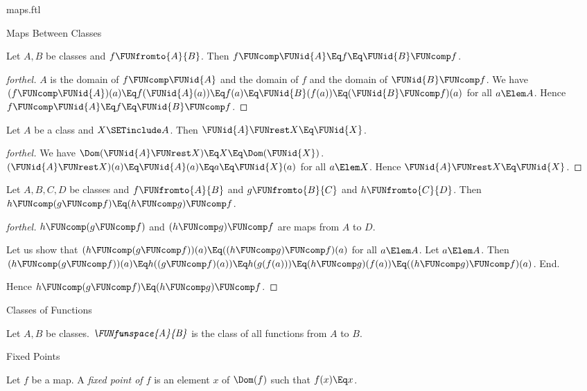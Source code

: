 \documentclass{stex}
\begin{document}
\begin{smodule}{maps.ftl}
\begin{sfragment}{Maps Between Classes}
  \begin{proposition}[forthel]
    Let $A, B$ be classes and $f \FUNfromto{A}{B}$.
    Then $f \FUNcomp \FUNid{A} \Eq f \Eq \FUNid{B} \FUNcomp f$.
  \end{proposition}
  \begin{proof}[forthel]
    $A$ is the domain of $f \FUNcomp \FUNid{A}$ and the domain of $f$ and the domain of $\FUNid{B} \FUNcomp f$.
    We have $(f \FUNcomp \FUNid{A})(a)
      \Eq f(\FUNid{A}(a))
      \Eq f(a)
      \Eq \FUNid{B}(f(a))
      \Eq (\FUNid{B} \FUNcomp f)(a)$
    for all $a \Elem A$.
    Hence $f \FUNcomp \FUNid{A}
      \Eq f
      \Eq \FUNid{B} \FUNcomp f$.
  \end{proof}

  \begin{proposition}[forthel]
    Let $A$ be a class and $X \SETinclude A$.
    Then $\FUNid{A} \FUNrest X \Eq \FUNid{X}$.
  \end{proposition}
  \begin{proof}[forthel]
    We have $\Dom(\FUNid{A} \FUNrest X)
      \Eq X
      \Eq \Dom(\FUNid{X})$.
    $(\FUNid{A} \FUNrest X)(a)
      \Eq \FUNid{A}(a)
      \Eq a
      \Eq \FUNid{X}(a)$
    for all $a \Elem X$.
    Hence $\FUNid{A} \FUNrest X \Eq \FUNid{X}$.
  \end{proof}

  \begin{proposition}[forthel]
    Let $A, B, C, D$ be classes and $f \FUNfromto{A}{B}$ and $g \FUNfromto{B}{C}$ and $h \FUNfromto{C}{D}$.
    Then $h \FUNcomp (g \FUNcomp f) \Eq (h \FUNcomp g) \FUNcomp f$.
  \end{proposition}
  \begin{proof}[forthel]
    $h \FUNcomp (g \FUNcomp f)$ and $(h \FUNcomp g) \FUNcomp f$ are maps from $A$ to $D$.

    Let us show that $(h \FUNcomp (g \FUNcomp f))(a) \Eq ((h \FUNcomp g) \FUNcomp f)(a)$ for all $a \Elem A$.
      Let $a \Elem A$.
      Then $(h \FUNcomp (g \FUNcomp f))(a)
        \Eq h((g \FUNcomp f)(a))
        \Eq h(g(f(a)))
        \Eq (h \FUNcomp g)(f(a))
        \Eq ((h \FUNcomp g) \FUNcomp f)(a)$.
    End.

    Hence $h \FUNcomp (g \FUNcomp f) \Eq (h \FUNcomp g) \FUNcomp f$.
  \end{proof}
\end{sfragment}

\begin{sfragment}{Classes of Functions}
  \begin{definition}[forthel]
    Let $A, B$ be classes.
    $\emph{\FUNfunspace{A}{B}}$ is the class of all functions from $A$ to $B$.
  \end{definition}
\end{sfragment}

\begin{sfragment}{Fixed Points}
  \begin{definition}[forthel]
    Let $f$ be a map.
    A \emph{fixed point of $f$} is an element $x$ of $\Dom(f)$ such that $f(x) \Eq x$.
  \end{definition}
\end{sfragment}
\end{smodule}
\end{document}
